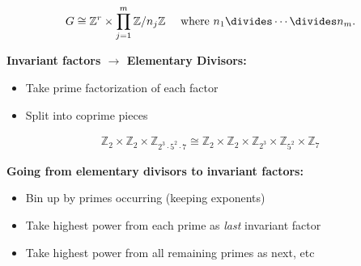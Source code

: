 \begin{definition}

\begin{align*}
G \cong {\mathbb{Z}}^r \times \prod_{j=1}^m {\mathbb{Z}}/n_j{\mathbb{Z}}
\quad \text{ where } n_1 \divides \cdots \divides n_m
.\end{align*}

\end{definition}

\textbf{Invariant factors \(\to\) Elementary Divisors:}

\begin{itemize}
\tightlist
\item
  Take prime factorization of each factor
\item
  Split into coprime pieces
\end{itemize}

\begin{example}

\begin{align*}
{\mathbb{Z}}_2 \times {\mathbb{Z}}_2 \times {\mathbb{Z}}_{2^3 \cdot 5^2 \cdot 7}
\cong
{\mathbb{Z}}_2 \times {\mathbb{Z}}_2 \times {\mathbb{Z}}_{2^3} \times {\mathbb{Z}}_{5^2} \times {\mathbb{Z}}_7
\end{align*}

\end{example}

\textbf{Going from elementary divisors to invariant factors:}

\begin{itemize}
\tightlist
\item
  Bin up by primes occurring (keeping exponents)
\item
  Take highest power from each prime as \emph{last} invariant factor
\item
  Take highest power from all remaining primes as next, etc
\end{itemize}

